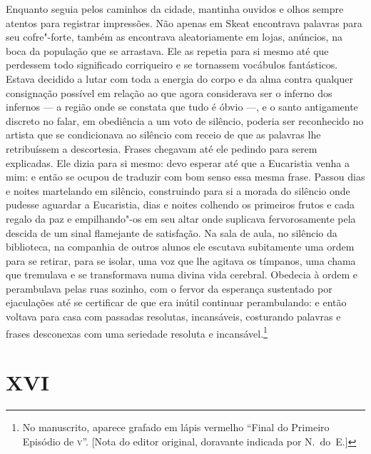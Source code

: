 Enquanto seguia pelos caminhos da cidade, mantinha ouvidos e olhos
sempre atentos para registrar impressões.  Não apenas em Skeat
encontrava palavras para seu cofre"-forte, também as encontrava
aleatoriamente em lojas, anúncios, na boca da população que se
arrastava.  Ele as repetia para si mesmo até que perdessem todo
significado corriqueiro e se tornassem vocábulos fantásticos.  Estava
decidido a lutar com toda a energia do corpo e da alma contra qualquer
consignação possível em relação ao que agora considerava ser o inferno
dos infernos --- a região onde se constata que tudo é óbvio ---, e o santo
antigamente \label{discreto"-no} discreto no falar, em obediência a um voto de silêncio,
poderia ser reconhecido no artista que se condicionava ao silêncio com
receio de que as palavras lhe retribuíssem a descortesia.  Frases
chegavam até ele pedindo para serem explicadas.  Ele dizia para si
mesmo: devo esperar até que a Eucaristia venha a mim: e então se ocupou
de traduzir com bom senso essa mesma frase.  Passou dias e noites
martelando em silêncio, construindo para si a morada do silêncio onde
pudesse aguardar a Eucaristia, dias e noites colhendo os primeiros
frutos e cada regalo da paz e empilhando"-os em seu altar onde suplicava
fervorosamente pela descida de um sinal flamejante de satisfação.  Na
sala de aula, no silêncio da biblioteca, na companhia de outros alunos
ele escutava subitamente uma ordem para se retirar, para se isolar, uma
voz que lhe agitava os tímpanos, uma chama que tremulava e se
transformava numa divina vida cerebral.  Obedecia à ordem e perambulava
pelas ruas sozinho, com o fervor da esperança sustentado por
ejaculações até se certificar de que era inútil continuar perambulando:
e então voltava para casa com passadas resolutas, incansáveis,
costurando palavras e frases desconexas com uma seriedade resoluta e
incansável.\footnote{ No manuscrito, aparece grafado em lápis vermelho “Final
do Primeiro Episódio de \textsc{v}”. [Nota do editor original, doravante indicada por N.~do~E.]}


\section*{XVI}

